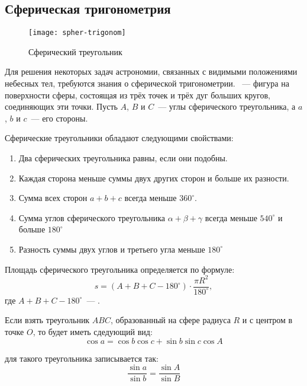\subsection{Сферическая тригонометрия}
\begin{wrapfigure}[10]{r}{.3\tw}
	\centering
	\vspace{-1pc}
 	\texttt{[image: spher-trigonom]}
 	\caption{Сферический треугольник}
\end{wrapfigure}
Для решения некоторых задач астрономии, связанных с видимыми положениями небесных тел, требуются знания о сферической тригонометрии. ~--- фигура на поверхности сферы, состоящая из трёх точек и трёх дуг больших кругов, соединяющих эти точки. Пусть $A$, $B$ и $C$~--- углы сферического треугольника, а $a$, $b$ и $c$~--- его стороны.

Сферические треугольники обладают следующими свойствами:
\begin{enumerate}[1.]
\item Два сферических треугольника равны, если они подобны.
\item Каждая сторона меньше суммы двух других сторон и больше их разности.
\item Сумма всех сторон $a+b+c$ всегда меньше $360^{\circ}$.
\item Сумма углов сферического треугольника $\alpha +\beta +\gamma$ всегда меньше $540^{\circ}$  и больше $180^{\circ}$
\item Разность суммы двух углов и третьего угла меньше $180^{\circ}$
\end{enumerate}

Площадь сферического треугольника определяется по формуле:
\begin{equation}
s=(A+B+C-180^{\circ}) \cdot \frac{\pi R^2}{180^{\circ}},
\end{equation}
где $A+B+C-180^{\circ}$~--- .

Если взять треугольник $ABC$, образованный на сфере радиуса $R$ и с центром в точке $O$, то  будет иметь сдедующий вид:
\begin{equation}
\cos a=\cos b\cos c+\sin b\sin c\cos A
\end{equation}

 для такого треугольника записывается так:
\begin{equation}
\frac{\sin a}{\sin b}=\frac{\sin A}{\sin B}
\end{equation}

